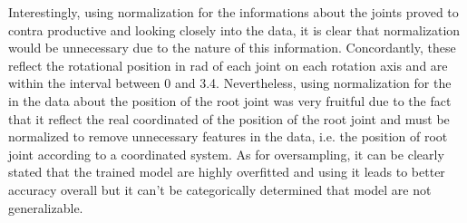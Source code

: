 		Interestingly, using normalization for the informations about the joints proved to contra productive and looking closely into the data, it is clear that normalization would be unnecessary due to the nature of this information. Concordantly, these reflect the rotational position in rad of each joint on each rotation axis and are within the interval between 0 and 3.4. Nevertheless, using normalization for the in the data about the position of the root joint was very fruitful due to the fact that it reflect the real coordinated of the position of the root joint and must be normalized to remove unnecessary features in the data, i.e. the position of root joint according to a coordinated system.\newline
		As for oversampling, it can be clearly stated that the trained model are highly overfitted and using it leads to better accuracy overall but it can't be categorically determined that model are not generalizable.
